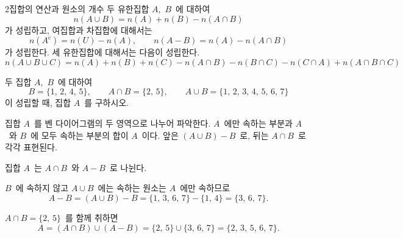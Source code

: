 \documentclass[10pt]{article}
\begin{document}
\begin{dmconcept}{2}{집합의 연산과 원소의 개수}
두 유한집합 $A$,\ $B$\ 에 대하여
\begin{equation*}
  n(A \cup B) = n(A) + n(B) - n(A \cap B)
\end{equation*}
가 성립하고, 여집합과 차집합에 대해서는
\begin{equation*}
  n(A^\mathrm{c}) = n(U) - n(A), \qquad n(A - B) = n(A) - n(A \cap B)
\end{equation*}
가 성립한다. 세 유한집합에 대해서는 다음이 성립한다.
\begin{equation*}
  n(A \cup B \cup C) = n(A) + n(B) + n(C) - n(A \cap B) - n(B \cap C) - n(C \cap A) + n(A \cap B \cap C)
\end{equation*}

\end{dmconcept}

\newpage


\begin{dmproblem}
두 집합 $A$,\ $B$\ 에 대하여
\begin{equation*}
  B = \{1,\, 2,\, 4,\, 5\}, \qquad A \cap B = \{2,\, 5\}, \qquad A \cup B = \{1,\, 2,\, 3,\, 4,\, 5,\, 6,\, 7\}
\end{equation*}
이 성립할 때, 집합 $A$\ 를 구하시오.
\end{dmproblem}

\begin{dmapproach}
집합 $A$\ 를 벤 다이어그램의 두 영역으로 나누어 파악한다. $A$\ 에만 속하는 부분과 $A$\ 와 $B$\ 에 모두 속하는 부분의 합이 $A$\ 이다. 앞은 $(A \cup B) - B$\ 로, 뒤는 $A \cap B$\ 로 각각 표현된다.
\end{dmapproach}

\begin{dmsolution}
집합 $A$\ 는 $A \cap B$\ 와 $A - B$\ 로 나뉜다.

$B$\ 에 속하지 않고 $A \cup B$\ 에는 속하는 원소는 $A$\ 에만 속하므로
\[ A - B = (A \cup B) - B = \{1,\, 3,\, 6,\, 7\} - \{1,\, 4\} = \{3,\, 6,\, 7\}. \]

$A \cap B = \{2,\, 5\}$\ 를 함께 취하면
\[ A = (A \cap B) \cup (A - B) = \{2,\, 5\} \cup \{3,\, 6,\, 7\} = \{2,\, 3,\, 5,\, 6,\, 7\}. \]
\end{dmsolution}

\dmchecktitle
\end{document}

